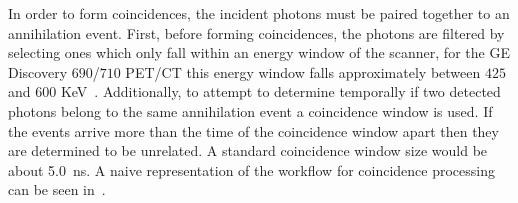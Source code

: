                 In order to form coincidences, the incident photons must be paired together to an annihilation event. First, before forming coincidences, the photons are filtered by selecting ones which only fall within an energy window of the scanner, for the \gls{GE} Discovery $690$/$710$ \gls{PET}/\gls{CT} this energy window falls approximately between $425$ and $600$ \gls{KeV}~. Additionally, to attempt to determine temporally if two detected photons belong to the same annihilation event a coincidence window is used. If the events arrive more than the time of the coincidence window apart then they are determined to be unrelated. A standard coincidence window size would be about \SI{5.0}{\nano\second}. A naive representation of the workflow for coincidence processing can be seen in~.
            
